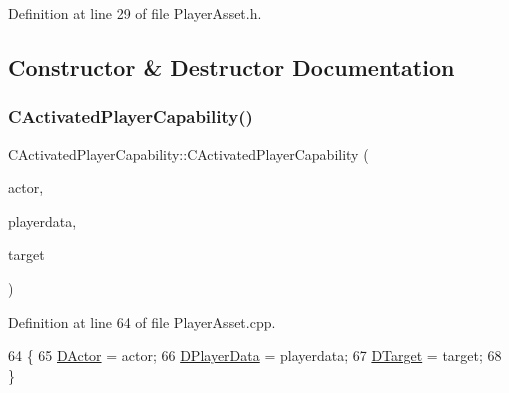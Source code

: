 Definition at line 29 of file Player\+Asset.\+h.



\subsection{Constructor \& Destructor Documentation}
\hypertarget{classCActivatedPlayerCapability_a1ece00ffb6a7b925c84dd94a7407a0d1}{}\label{classCActivatedPlayerCapability_a1ece00ffb6a7b925c84dd94a7407a0d1} 
\subsubsection{\texorpdfstring{C\+Activated\+Player\+Capability()}{CActivatedPlayerCapability()}}
{\footnotesize\ttfamily C\+Activated\+Player\+Capability\+::\+C\+Activated\+Player\+Capability (\begin{DoxyParamCaption}\item[{std\+::shared\+\_\+ptr$<$ \hyperlink{classCPlayerAsset}{C\+Player\+Asset} $>$}]{actor,  }\item[{std\+::shared\+\_\+ptr$<$ \hyperlink{classCPlayerData}{C\+Player\+Data} $>$}]{playerdata,  }\item[{std\+::shared\+\_\+ptr$<$ \hyperlink{classCPlayerAsset}{C\+Player\+Asset} $>$}]{target }\end{DoxyParamCaption})}



Definition at line 64 of file Player\+Asset.\+cpp.


\begin{DoxyCode}
64                                                                                                            
                                                                   \{
65     \hyperlink{classCActivatedPlayerCapability_a54ca944b47bff2718330639941d402b0}{DActor} = actor;
66     \hyperlink{classCActivatedPlayerCapability_a9bf27c322a73f4b11c8183cc1973c3d8}{DPlayerData} = playerdata;
67     \hyperlink{classCActivatedPlayerCapability_a8a1cf50b6501bcfd55af0c935828e395}{DTarget} = target;
68 \}
\end{DoxyCode}
\hypertarget{classCActivatedPlayerCapability_a75845fda9554fb75644aae5a6c5f0084}{}\label{classCActivatedPlayerCapability_a75845fda9554fb75644aae5a6c5f0084} 
